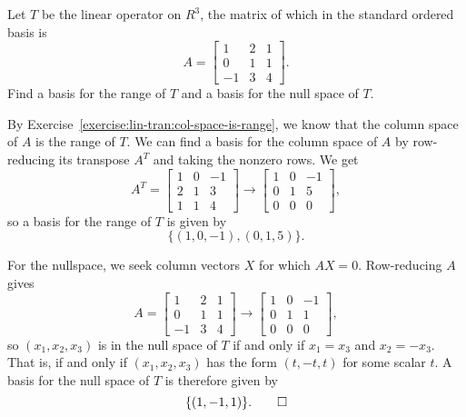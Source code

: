  Let $T$ be the linear operator on $R^3$, the matrix of
which in the standard ordered basis is
\begin{equation*}
  A =
  \begin{bmatrix}
    1 & 2 & 1 \\
    0 & 1 & 1 \\
    -1 & 3 & 4
  \end{bmatrix}.
\end{equation*}
Find a basis for the range of $T$ and a basis for the null space of
$T$.
\begin{solution}
  By Exercise~\ref{exercise:lin-tran:col-space-is-range}, we know that
  the column space of $A$ is the range of $T$. We can find a basis for
  the column space of $A$ by row-reducing its transpose $A^T$ and
  taking the nonzero rows. We get
  \begin{equation*}
    A^T =
    \begin{bmatrix}
      1 & 0 & -1 \\
      2 & 1 & 3 \\
      1 & 1 & 4
    \end{bmatrix}
    \rightarrow
    \begin{bmatrix}
      1 & 0 & -1 \\
      0 & 1 & 5 \\
      0 & 0 & 0
    \end{bmatrix},
  \end{equation*}
  so a basis for the range of $T$ is given by
  \begin{equation*}
    \{(1, 0, -1), (0, 1, 5)\}.
  \end{equation*}

  For the nullspace, we seek column vectors $X$ for which $AX =
  0$. Row-reducing $A$ gives
  \begin{equation*}
    A =
    \begin{bmatrix}
      1 & 2 & 1 \\
      0 & 1 & 1 \\
      -1 & 3 & 4
    \end{bmatrix}
    \rightarrow
    \begin{bmatrix}
      1 & 0 & -1 \\
      0 & 1 & 1 \\
      0 & 0 & 0
    \end{bmatrix},
  \end{equation*}
  so $(x_1,x_2,x_3)$ is in the null space of $T$ if and only if
  $x_1 = x_3$ and $x_2 = -x_3$. That is, if and only if
  $(x_1,x_2,x_3)$ has the form $(t,-t,t)$ for some scalar $t$. A basis
  for the null space of $T$ is therefore given by
  \begin{equation*}
    \{ (1,-1,1) \}. \qedhere
  \end{equation*}
\end{solution}

